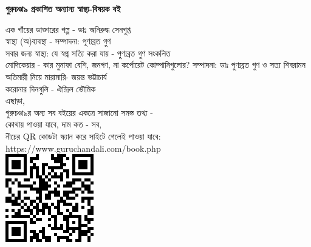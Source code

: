 \clearpage
\small
\centering
\textbf{গুরুচণ্ডা৯ প্রকাশিত অন্যান্য স্বাস্থ্য-বিষয়ক বই} \\
\raggedright
\scriptsize
এক গাঁয়ের ডাক্তারের গল্প - ডাঃ অনিরুদ্ধ সেনগুপ্ত \\
স্বাস্থ্য (অ)ব্যবস্থা - সম্পাদনা: পূণ্যব্রত গুণ \\
সবার জন্য স্বাস্থ্য: যে স্বপ্ন সত্যি করা যায় - পুণ্যব্রত গুণ সংকলিত \\
মোদিকেয়ার - কার মুনাফা বেশি, জনগণ, না কর্পোরেট কোম্পানিগুলোর? 
সম্পাদনা: ডাঃ পুণ্যব্রত গুণ ও সত্য শিবরামন \\
অতিমারী নিয়ে মারামারি- জয়ন্ত ভট্টাচার্য \\
করোনার দিনগুলি -  ঐন্দ্রিল ভৌমিক \\
\baselineskip
\raggedleft
\scriptsize
এছাড়া, \\
গুরুচণ্ডা৯র অন্য সব বইয়ের একত্রে সাজানো সমস্ত তথ্য - \\
কোথায় পাওয়া যাবে, দাম কত - সব, \\
নীচের QR কোডটা স্ক্যান করে সাইটে গেলেই পাওয়া যাবে: \\
https://www.guruchandali.com/book.php \\
\baselineskip
\includegraphics[scale=0.8]{Images/QRCode_2022.png}